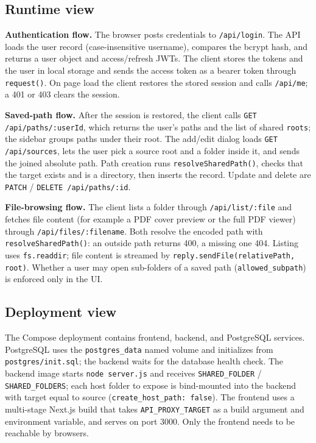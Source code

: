 \documentclass[10pt]{article}
\begin{document}
\subsection{Runtime view}
\textbf{Authentication flow.} The browser posts credentials to \texttt{/api/login}. The API
loads the user record (case-insensitive username), compares the bcrypt hash, and returns a user
object and access/refresh JWTs. The client stores the tokens and the user in local storage and
sends the access token as a bearer token through \texttt{request()}. On page load the client
restores the stored session and calls \texttt{/api/me}; a 401 or 403 clears the session.

\textbf{Saved-path flow.} After the session is restored, the client calls
\texttt{GET /api/paths/:userId}, which returns the user's paths and the list of shared
\texttt{roots}; the sidebar groups paths under their root. The add/edit dialog loads
\texttt{GET /api/sources}, lets the user pick a source root and a folder inside it, and sends
the joined absolute path. Path creation runs \texttt{resolveSharedPath()}, checks that the target
exists and is a directory, then inserts the record. Update and delete are \texttt{PATCH} /
\texttt{DELETE /api/paths/:id}.

\textbf{File-browsing flow.} The client lists a folder through \texttt{/api/list/:file} and
fetches file content (for example a PDF cover preview or the full PDF viewer) through
\texttt{/api/files/:filename}. Both resolve the encoded path with \texttt{resolveSharedPath()}:
an outside path returns 400, a missing one 404. Listing uses \texttt{fs.readdir}; file content is
streamed by \texttt{reply.sendFile(relativePath, root)}. Whether a user may open sub-folders of a
saved path (\texttt{allowed\_subpath}) is enforced only in the UI.

\subsection{Deployment view}
The Compose deployment contains frontend, backend, and PostgreSQL services. PostgreSQL uses
the \texttt{postgres\_data} named volume and initializes from \texttt{postgres/init.sql};
the backend waits for the database health check. The backend image starts
\texttt{node server.js} and receives \texttt{SHARED\_FOLDER} / \texttt{SHARED\_FOLDERS}; each host
folder to expose is bind-mounted into the backend with target equal to source
(\texttt{create\_host\_path: false}). The frontend uses a multi-stage Next.js build that takes
\texttt{API\_PROXY\_TARGET} as a build argument and environment variable, and serves on port 3000.
Only the frontend needs to be reachable by browsers.
\end{document}
